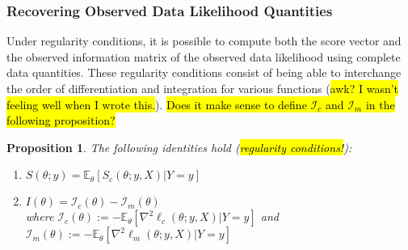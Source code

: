 \documentclass[11pt, oneside]{article}   	%
\newcommand{\bE}{\mathbb{E}}
\newtheorem{proposition}{Proposition}[section]
\begin{document}
\subsubsection{Recovering Observed Data Likelihood Quantities}

Under regularity conditions, it is possible to compute both the score vector and the observed information matrix of the observed data likelihood using complete data quantities. These regularity conditions consist of being able to interchange the order of differentiation and integration for various functions (\hl{awk? I wasn't feeling well when I wrote this.}). \hl{Does it make sense to define $\mathcal{I}_c$ and $\mathcal{I}_m$ in the following proposition?}

\begin{proposition}
    \label{thm:EM_decomp}
    The following identities hold (\hl{regularity conditions!}):
    \begin{enumerate}[label=(\roman*)]
        \item $S(\theta; y) = \bE_\theta [S_c(\theta; y, X)|Y=y]$ \label{eq:obs_score_identity}
        \item $I(\theta) = \mathcal{I}_c(\theta) - \mathcal{I}_m(\theta)$ \label{eq:obs_info_identity}\\
        where $\mathcal{I}_c(\theta) := - \bE_\theta \left[ \nabla^2 \ell_c(\theta; y, X) | Y=y \right]$ and $\mathcal{I}_m(\theta) := - \bE_\theta \left[ \nabla^2 \ell_m(\theta; y, X) | Y=y \right]$
    \end{enumerate}
\end{proposition}
\end{document}
